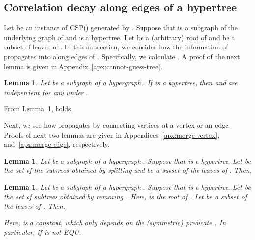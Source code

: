 \documentclass[letterpaper,11pt]{article}
\newtheorem{lemma}[theorem]{Lemma}
\newcommand{\csp}[1]{\textsf{CSP}(#1)\xspace}
\newcommand{\equ}{\textsf{EQU}\xspace}
\begin{document}
\subsection{Correlation decay along edges of a hypertree}
Let  be an instance of \csp{} generated by .
Suppose that  is a subgraph of the underlying graph of  and  is a hypertree.
Let  be a (arbitrary) root of  and  be a subset of leaves of .
In this subsection,
we consider how the information of  propagates into  along edges of .
Specifically, we calculate .
A proof of the next lemma is given in Appendix~\ref{apx:cannot-guess-tree}.
\begin{lemma}\label{lmm:cannot-guess-tree}
  Let  be a subgraph of a hypergraph .
  If  is a hypertree, 
  then  and  are independent for any  under .
\end{lemma}
From Lemma~\ref{lmm:cannot-guess-tree},
 holds.

Next, we see how  propagates by connecting vertices at a vertex or an edge.
Proofs of next two lemmas are given in Appendices~\ref{apx:merge-vertex}, and~\ref{apx:merge-edge}, respectively.
\begin{lemma}\label{lmm:merge-vertex}
  Let  be a subgraph of a hypergraph .
  Suppose that  is a hypertree.
  Let  be the set of the subtrees obtained by splitting  and  be a subset of the leaves of .
  Then,
  
\end{lemma}
\begin{lemma}\label{lmm:merge-edge}
  Let  be a subgraph of a hypergraph .
  Suppose that  is a hypertree.
  Let  be the set of subtrees obtained by removing .
  Here,  is the root of .
  Let  be a subset of the leaves of .
  Then,
  
  Here,  is a constant, which only depends on the (symmetric) predicate .
  In particular,  if  is not \equ.
\end{lemma}
\end{document}
